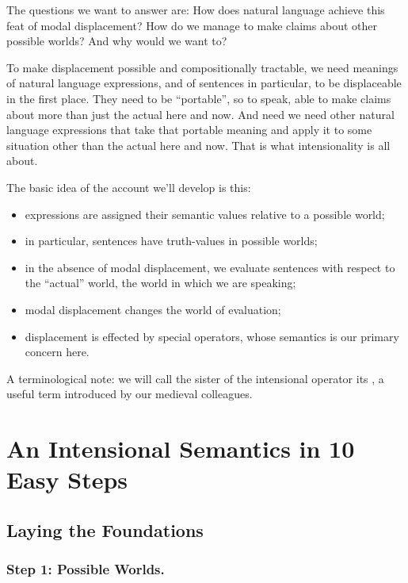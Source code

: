 The questions we want to answer are: How does natural language achieve
this feat of modal displacement? How do we manage to make claims about
other possible worlds? And why would we want to?

To make displacement possible and compositionally tractable, we need
meanings of natural language expressions, and of sentences in
particular, to be displaceable in the first place. They need to be
``portable'', so to speak, able to make claims about more than just
the actual here and now. And need we need other natural language
expressions that take that portable meaning and apply it to some
situation other than the actual here and now. That is what
intensionality is all about.

The basic idea of the account we'll develop is this:

\begin{itemize}
\item expressions are assigned their semantic values relative to a
  possible world;
\item in particular, sentences have truth-values in possible worlds;
\item in the absence of modal displacement, we evaluate sentences with
  respect to the ``actual'' world, the world in which we are speaking;
\item modal displacement changes the world of evaluation;
\item displacement is effected by special operators, whose semantics
  is our primary concern here.
\end{itemize}
%
A terminological note: we will call the sister of the intensional
operator its , a useful term introduced by our
medieval colleagues.

\clearpage
\section{An Intensional Semantics in 10 Easy Steps} \label{sec:an-intens-semant}

\subsection{Laying the Foundations} \label{sec:laying-foundations}

\subsubsection{Step 1: Possible Worlds.} \label{sec:world-parameter}

